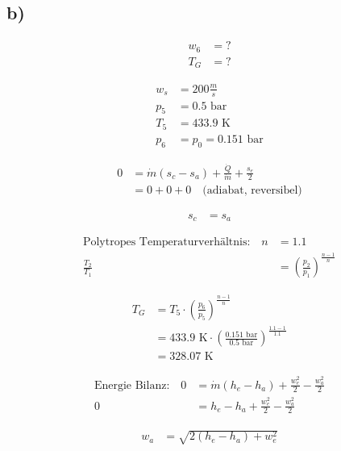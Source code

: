 

\subsection*{b)}

\begin{align*}
    w_6 &= ? \\
    T_G &= ?
\end{align*}

\begin{align*}
    w_s &= 200 \frac{m}{s} \\
    p_5 &= 0.5 \text{ bar} \\
    T_5 &= 433.9 \text{ K} \\
    p_6 &= p_0 = 0.151 \text{ bar}
\end{align*}

\begin{align*}
    0 &= \dot{m} (s_c - s_a) + \frac{\dot{Q}}{\dot{m}} + \frac{s_e}{2} \\
    &= 0 + 0 + 0 \quad \text{(adiabat, reversibel)}
\end{align*}

\begin{align*}
    s_c &= s_a
\end{align*}

\begin{align*}
    \text{Polytropes Temperaturverhältnis:} \quad n &= 1.1 \\
    \frac{T_2}{T_1} &= \left(\frac{p_2}{p_1}\right)^{\frac{n-1}{n}}
\end{align*}

\begin{align*}
    T_G &= T_5 \cdot \left(\frac{p_6}{p_5}\right)^{\frac{n-1}{n}} \\
    &= 433.9 \text{ K} \cdot \left(\frac{0.151 \text{ bar}}{0.5 \text{ bar}}\right)^{\frac{1.1-1}{1.1}} \\
    &= 328.07 \text{ K}
\end{align*}

\begin{align*}
    \text{Energie Bilanz:} \quad 0 &= \dot{m} \left( h_e - h_a \right) + \frac{w_e^2}{2} - \frac{w_a^2}{2} \\
    0 &= h_e - h_a + \frac{w_e^2}{2} - \frac{w_a^2}{2}
\end{align*}

\begin{align*}
    w_a &= \sqrt{2 \left( h_e - h_a \right) + w_e^2}
\end{align*}

